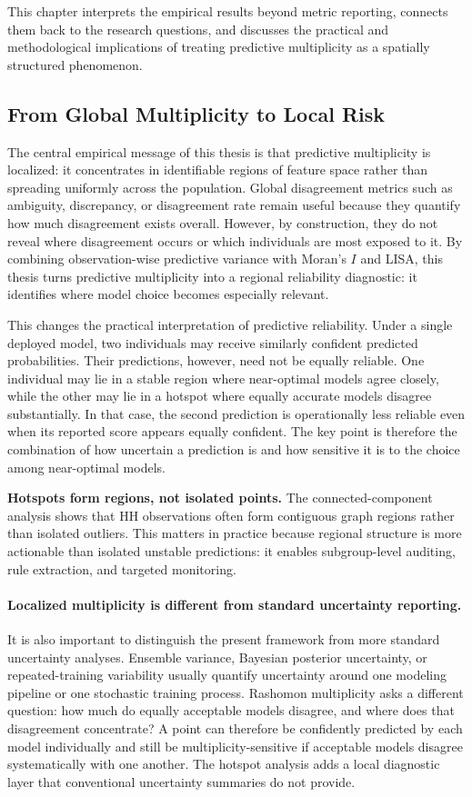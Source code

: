 This chapter interprets the empirical results beyond metric reporting, connects them back 
to the research questions, and discusses the practical and methodological implications of 
treating predictive multiplicity as a spatially structured phenomenon.

\subsection{From Global Multiplicity to Local Risk}

The central empirical message of this thesis is that predictive multiplicity is localized:
it concentrates in identifiable regions of feature space rather than spreading uniformly
across the population. Global disagreement metrics such as ambiguity, discrepancy, or
disagreement rate remain useful because they quantify how much disagreement exists
overall. However, by construction, they do not reveal where disagreement occurs or which
individuals are most exposed to it. By combining observation-wise predictive variance
with Moran's \(I\) and LISA, this thesis turns predictive multiplicity into a regional
reliability diagnostic: it identifies where model choice becomes especially relevant.

This changes the practical interpretation of predictive reliability. Under a single deployed
model, two individuals may receive similarly confident predicted probabilities. Their 
predictions, however, need not be equally reliable. One individual may lie in a stable region
where near-optimal models agree closely, while the other may lie in a hotspot where equally
accurate models disagree substantially. In that case, the second prediction is operationally
less reliable even when its reported score appears equally confident. The key point is therefore
the combination of how uncertain a prediction is and how sensitive it is to the choice among 
near-optimal models.

\textbf{Hotspots form regions, not isolated points.}
The connected-component analysis shows that HH observations often form contiguous graph regions
rather than isolated outliers. This matters in practice because regional structure is more
actionable than isolated unstable predictions: it enables subgroup-level auditing, rule
extraction, and targeted monitoring.

\paragraph{Localized multiplicity is different from standard uncertainty reporting.}
It is also important to distinguish the present framework from more standard uncertainty
analyses. Ensemble variance, Bayesian posterior uncertainty, or repeated-training variability
usually quantify uncertainty around one modeling pipeline or one stochastic training process.
Rashomon multiplicity asks a different question: how much do equally acceptable models disagree,
and where does that disagreement concentrate? A point can therefore be confidently predicted by
each model individually and still be multiplicity-sensitive if acceptable models disagree 
systematically with one another. The hotspot analysis adds a local diagnostic layer that
conventional uncertainty summaries do not provide.

